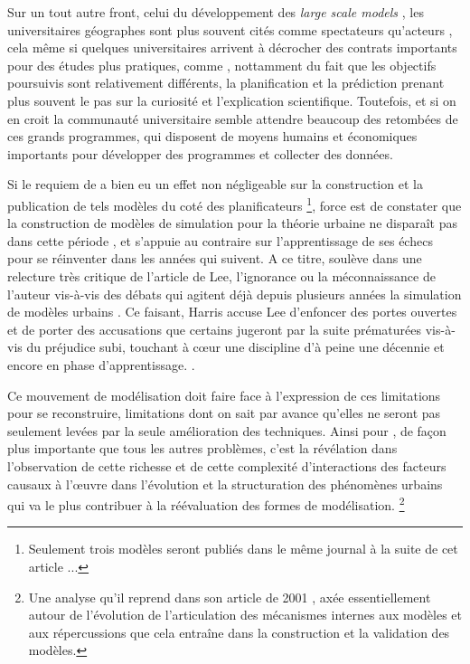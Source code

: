 Sur un tout autre front, celui du développement des \textit{large scale models} \autocites[8]{Batty1976}, les universitaires géographes sont plus souvent cités comme spectateurs qu'acteurs \autocite[9]{Batty1994}, cela même si quelques universitaires arrivent à décrocher des contrats importants \autocite{Barnes2006a} pour des études plus pratiques, comme \textcite{Garrison1959}, nottamment du fait que les objectifs poursuivis sont relativement différents, la planification et la prédiction prenant plus souvent le pas sur la curiosité et l'explication scientifique. Toutefois, et si on en croit \textcite{Haggett1969} la communauté universitaire semble attendre beaucoup des retombées de ces grands programmes, qui disposent de moyens humains et économiques importants pour développer des programmes et collecter des données.

Si le requiem de \textcite{Lee1973} a bien eu un effet non négligeable sur la construction et la publication de tels modèles du coté des planificateurs \footnote{Seulement trois modèles seront publiés dans le même journal à la suite de cet article ...}, force est de constater que la construction de modèles de simulation pour la théorie urbaine ne disparaît pas dans cette période \autocite[11-12]{Batty1994}, et s'appuie au contraire sur l'apprentissage de ses échecs pour se réinventer dans les années qui suivent. A ce titre, \textcite{Harris1994} soulève dans une relecture très critique de l'article de Lee, l'ignorance ou la méconnaissance de l'auteur vis-à-vis des débats qui agitent déjà depuis plusieurs années la simulation de modèles urbains \autocites{Batty1971, Wilson1970, Orcutt1957, Harris1968}. Ce faisant, Harris accuse Lee d'enfoncer des portes ouvertes et de porter des accusations que certains jugeront par la suite prématurées vis-à-vis du préjudice subi, touchant à cœur une discipline d'à peine une décennie et encore en phase d'apprentissage. \autocite[p11]{Batty1994}.

Ce mouvement de modélisation doit faire face à l'expression de ces limitations pour se reconstruire, limitations dont on sait par avance qu'elles ne seront pas seulement levées par la seule amélioration des techniques. Ainsi pour \textcite[11]{Batty1976}, de façon plus importante que tous les autres problèmes, c'est la révélation dans l'observation de cette richesse et de cette complexité d'interactions des facteurs causaux à l’œuvre dans l'évolution et la structuration des phénomènes urbains qui va le plus contribuer à la réévaluation des formes de modélisation. \footnote{Une analyse qu'il reprend dans son article de 2001 \autocite{Batty2001}, axée essentiellement autour de l'évolution de l'articulation des mécanismes internes aux modèles et aux répercussions que cela entraîne dans la construction et la validation des modèles.}


